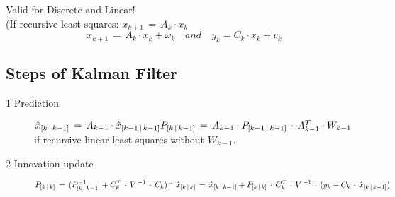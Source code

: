 \begin{tcolorbox}[colback=violet!5!white,colframe=violet!75!black,title=\textbf{Kalman Filter}]
Valid for Discrete and Linear!\\
(If recursive least squares: \( x_{ k+1 }\, =\, A_{ k }\cdot x_{ k } \)
\begin{equation*}
x_{ k+1 }\, =\, A_{ k }\cdot x_{ k }+\omega _{ k }\quad and\quad y_{ k }=C_{ k }\cdot x_{ k }+v_{ k }
\end{equation*}
\subsection*{Steps of Kalman Filter}
\begin{description}
\item[1 Prediction] $\hat { x } _{ [k\, |\, k-1] }\, =\, A_{ k-1 }\cdot \hat { x } _{ [k-1\, |\, k-1] }\\ P_{ [k\, |\, k-1] }\, =\, A_{ k-1 }\cdot { P }_{ [k-1\, |\, k-1] }\, \cdot \, A_{ k-1 }^{ T }\cdot { W }_{ k-1 }$ \\
if recursive linear least squares without \( { W }_{ k-1 } \).
\item[2 Innovation update] $P_{ [k\, |\, k] }\, =\, (P_{ [k\, |\, k-1] }^{ -1 }+C_{ k }^{ T }\, \cdot \, { V\,  }^{ -1 }\, \cdot \, C_{ k })^{ -1 }\\ \hat { x } _{ [k\, |\, k] }\, =\, \hat { x } _{ [k\, |\, k-1] }+P_{ [k\, |\, k] }\, \cdot \, C_{ k }^{ T }\, \cdot \, { V\,  }^{ -1 }\, \cdot \, (y_{ k }-C_{ k }\, \cdot \, \hat { x } _{ [k\, |\, k-1] })$
\end{description}
\end{tcolorbox}

